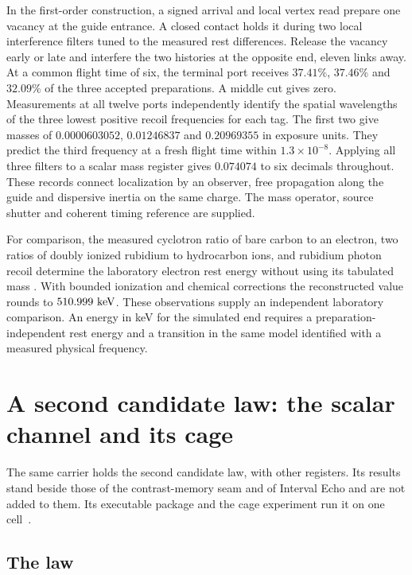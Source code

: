 \documentclass[11pt]{article}
\theoremstyle{definition}
\theoremstyle{remark}
\theoremstyle{plain}
\begin{document}
In the first-order construction, a signed arrival and local vertex read
prepare one vacancy at the guide entrance. A closed contact holds it
during two local interference filters tuned to the measured rest
differences. Release the vacancy early or late and interfere the two
histories at the opposite end, eleven links away. At a common flight
time of six, the terminal port receives $37.41\%$, $37.46\%$ and
$32.09\%$ of the three accepted preparations. A middle cut gives
zero. Measurements at all twelve ports independently identify the spatial
wavelengths of the three lowest positive recoil frequencies for each
tag. The first two give masses of $0.0000603052$, $0.01246837$ and
$0.20969355$ in exposure units. They predict the third frequency at a
fresh flight time within $1.3\times10^{-8}$. Applying all three filters
to a scalar mass register gives $0.074074$ to six decimals throughout.
These records connect localization by an observer, free propagation
along the guide and dispersive inertia on the same charge. The mass
operator, source shutter and coherent timing reference are supplied.

For comparison, the measured cyclotron ratio of bare carbon to an
electron, two ratios of doubly ionized rubidium to hydrocarbon ions, and
rubidium photon recoil determine the laboratory electron rest energy
without using its tabulated mass \cite{farnham,rainville,bouchendira}.
With bounded ionization and chemical corrections the reconstructed
value rounds to $510.999\ {\rm keV}$. These observations supply an
independent laboratory comparison. An energy in keV for the simulated
end requires a preparation-independent rest energy and a transition
in the same model identified with a measured physical frequency.

\section{A second candidate law: the scalar channel and its cage}
\label{sec:scalar}

The same carrier holds the second candidate law, with other registers. Its
results stand beside those of the contrast-memory seam and of Interval Echo
and are not added to them. Its executable package and the cage experiment
run it on one cell~\cite{ophrepo}.

\subsection{The law}
\end{document}
